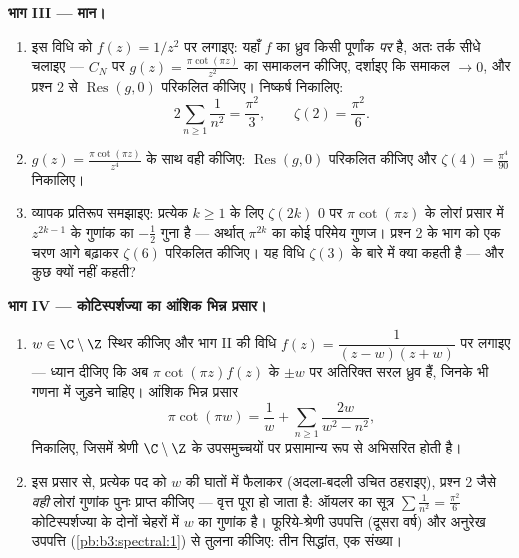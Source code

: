 \begin{problem}
\medskip
\noindent\textbf{भाग III --- मान।}
\begin{enumerate}[resume]
  \item इस विधि को $f(z) = 1/z^2$ पर लगाइए: यहाँ $f$ का ध्रुव किसी
        पूर्णांक \emph{पर} है, अतः तर्क सीधे चलाइए --- $C_N$ पर
        $g(z) = \frac{\pi\cot(\pi
        z)}{z^2}$ का समाकलन कीजिए, दर्शाइए कि समाकल $\to 0$, और प्रश्न 2
        से $\operatorname{Res}(g, 0)$ परिकलित कीजिए। निष्कर्ष निकालिए:
        \[
        2\sum_{n\geq1}\frac1{n^2} = \frac{\pi^2}{3},
        \qquad \zeta(2) = \frac{\pi^2}6 .
        \]
  \item $g(z) = \frac{\pi\cot(\pi z)}{z^4}$ के साथ वही कीजिए: $\operatorname{Res}(g, 0)$ परिकलित कीजिए और $\zeta(4) = \frac{\pi^4}{90}$
        निकालिए।
  \item व्यापक प्रतिरूप समझाइए: प्रत्येक $k \geq 1$ के लिए $\zeta(2k)$
        $0$ पर $\pi\cot(\pi
        z)$ के लोरां प्रसार में $z^{2k-1}$ के गुणांक का
        $-\frac12$ गुना है --- अर्थात् $\pi^{2k}$ का कोई परिमेय गुणज। प्रश्न
        2 के भाग को एक चरण आगे बढ़ाकर $\zeta(6)$ परिकलित कीजिए। यह विधि
        $\zeta(3)$ के बारे में क्या कहती है --- और कुछ क्यों नहीं
        कहती?
\end{enumerate}

\medskip
\noindent\textbf{भाग IV --- कोटिस्पर्शज्या का आंशिक भिन्न
प्रसार।}
\begin{enumerate}[resume]
  \item $w \in \C\setminus\Z$ स्थिर कीजिए और भाग II की विधि $f(z) = \dfrac{1}{(z - w)(z + w)}$ पर लगाइए ---
        ध्यान दीजिए कि अब $\pi\cot(\pi z)f(z)$ के $\pm w$ पर अतिरिक्त सरल ध्रुव हैं,
        जिनके  भी गणना में जुड़ने चाहिए। आंशिक भिन्न प्रसार
        \[
        \pi\cot(\pi w) = \frac1w +
        \sum_{n\geq1}\frac{2w}{w^2 - n^2},
        \]
        निकालिए, जिसमें श्रेणी $\C\setminus\Z$ के  उपसमुच्चयों पर
        प्रसामान्य रूप से अभिसरित होती है।
  \item इस प्रसार से, प्रत्येक पद को $w$ की घातों में फैलाकर
        (अदला-बदली उचित ठहराइए), प्रश्न 2 जैसे \emph{वही} लोरां
        गुणांक पुनः प्राप्त कीजिए --- वृत्त पूरा हो जाता है:
        ऑयलर का सूत्र $\sum\frac1{n^2} = \frac{\pi^2}6$ कोटिस्पर्शज्या के दोनों चेहरों में
        $w$ का गुणांक है। फूरिये-श्रेणी उपपत्ति (दूसरा वर्ष) और
        अनुरेख उपपत्ति (\cref{pb:b3:spectral:1}) से तुलना कीजिए: तीन सिद्धांत, एक
        संख्या।
\end{enumerate}


\end{problem}
